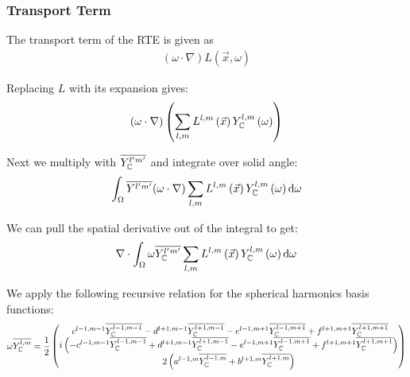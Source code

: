 \documentclass[10pt]{scrartcl}
\begin{document}
\subsubsection{Transport Term}
\label{sec:complex_transport_term}

The transport term of the RTE is given as
\begin{align*}
(\omega\cdot\nabla)L(\vec{x}, \omega)
\end{align*}

Replacing $L$ with its expansion gives:
\begin{align*}
\left(\omega\cdot\nabla\right)
\left(
\sum_{l,m}
{
L^{l,m}\left(\vec{x}\right )
Y_{\mathbb{C}}^{l,m}\left(\omega\right)
}
\right)
\end{align*}

Next we multiply with $\overline{Y_{\mathbb{C}}^{l'm'}}$ and integrate over solid angle:
\begin{align*}
\int_\Omega
{
\overline{Y^{l'm'}}(\omega\cdot\nabla)
\sum_{l,m}
{
L^{l,m}\left(\vec{x}\right)
Y_{\mathbb{C}}^{l,m}\left(\omega\right)
}
}
\,\mathrm{d}\omega
\end{align*}



We can pull the spatial derivative out of the integral to get:
\begin{align}
\nabla\cdot\int_\Omega
{
\omega\overline{Y_{\mathbb{C}}^{l'm'}}
\sum_{l,m}
{
L^{l,m}\left(\vec{x}\right)
Y_{\mathbb{C}}^{l,m}\left(\omega\right)
}
\,\mathrm{d}\omega
}
\label{eq:complex_transport_a}
\end{align}




We apply the following recursive relation for the spherical harmonics basis functions:
\begin{align}
\omega\overline{Y_{\mathbb{C}}^{l,m}} = \frac{1}{2}
\begin{pmatrix}
\ c^{l-1, m-1}\overline{Y_{\mathbb{C}}^{l-1,m-1}} - d^{l+1, m-1}\overline{Y_{\mathbb{C}}^{l+1,m-1}} - e^{l-1, m+1}\overline{Y_{\mathbb{C}}^{l-1,m+1}} + f^{l+1, m+1}\overline{Y_{\mathbb{C}}^{l+1,m+1}}\\
i\left(-c^{l-1, m-1}\overline{Y_{\mathbb{C}}^{l-1,m-1}} + d^{l+1, m-1}\overline{Y_{\mathbb{C}}^{l+1,m-1}} - e^{l-1, m+1}\overline{Y_{\mathbb{C}}^{l-1,m+1}} + f^{l+1, m+1}\overline{Y_{\mathbb{C}}^{l+1,m+1}}\right) \\
2\left(a^{l-1, m}\overline{Y_{\mathbb{C}}^{l-1,m}}+b^{l+1, m}\overline{Y_{\mathbb{C}}^{l+1,m}}\right)
\end{pmatrix}
\label{eq:recursive_relation}
\end{align}
\end{document}
